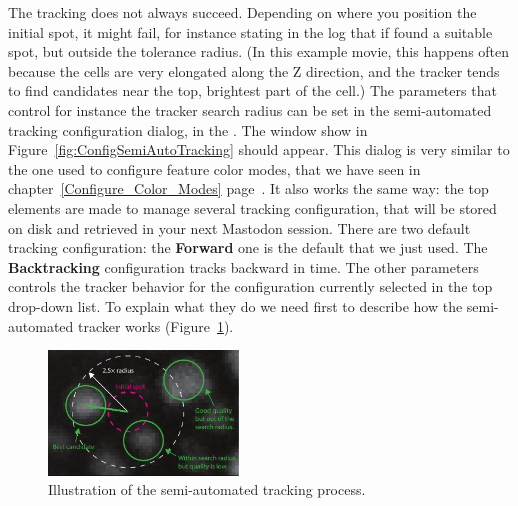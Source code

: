 The tracking does not always succeed. 
Depending on where you position the initial spot, it might fail, for instance stating in the log that if found a suitable spot, but outside the tolerance radius.
(In this example movie, this happens often because the cells are very elongated along the Z direction, and the tracker tends to find candidates near the top, brightest part of the cell.) 
The parameters that control for instance the tracker search radius can be set in the semi-automated tracking configuration dialog, in the .
The window show in Figure~\ref{fig:ConfigSemiAutoTracking} should appear.
This dialog is very similar to the one used to configure feature color modes, that we have seen in chapter~\ref{Configure_Color_Modes} page~\pageref{Configure_Color_Modes}.
It also works the same way: the top elements are made to manage several tracking configuration, that will be stored on disk and retrieved in your next Mastodon session. 
There are two default tracking configuration: the \textbf{Forward} one is the default that we just used. 
The \textbf{Backtracking} configuration tracks backward in time. 
The other parameters controls the tracker behavior for the configuration currently selected in the top drop-down list.
To explain what they do we need first to describe how the semi-automated tracker works (Figure~\ref{fig:ExplainSemiAutoTracking}).

\begin{figure}
    \centering
    \includegraphics[width=0.45\textwidth]{figures/Mastodon_ExplainSemiAutoTracker_copie.pdf}
    \caption{Illustration of the semi-automated tracking process.}
    \label{fig:ExplainSemiAutoTracking}
\end{figure}

